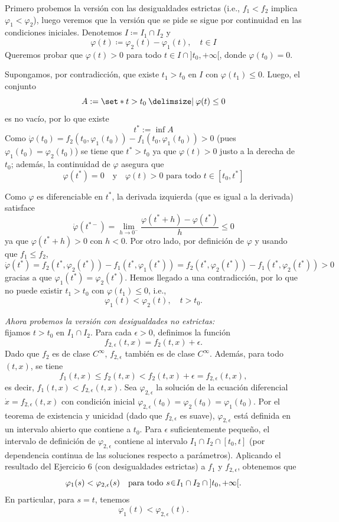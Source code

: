 \begin{sol}[Demostración]
Primero probemos la versión con las desigualdades estrictas (i.e.,  $f_1 < f_2$ implica $\varphi_1 < \varphi_2$), luego veremos que la versión que se pide se sigue por continuidad en las condiciones iniciales.
Denotemos $I \coloneqq I_1 \cap I_2$ y
\[
\varphi(t) \coloneqq \varphi_2(t) - \varphi_1(t), \quad t \in I
\]
Queremos probar que $\varphi(t) > 0$ para todo $t \in I \cap {]t_0,+\infty[}$, donde $\varphi(t_0)=0$.

Supongamos, por contradicción, que existe $t_1>t_0$ en $I$ con $\varphi(t_1)\leq0$. Luego, el conjunto
\[
A := \set*{ t>t_0 \given \varphi(t) \leq 0 }
\]
es no vacío, por lo que existe
\[
t^* := \inf A
\]
Como $\dot\varphi(t_0) = f_2(t_0, \varphi_1(t_0)) - f_1(t_0, \varphi_1(t_0)) > 0$ (pues $\varphi_1(t_0) = \varphi_2(t_0)$) se tiene que $t^* > t_0$ ya que $\varphi(t) > 0$ justo a la derecha de $t_0$; además, la continuidad de $\varphi$ asegura que 
\[
\varphi(t^*) = 0 \quad \text{y} \quad \varphi(t) > 0 \text{ para todo } t \in [t_0, t^*]
\]

Como $\varphi$ es diferenciable en $t^*$, la derivada izquierda (que es igual a la derivada) satisface
\[
\dot\varphi(t^{*-}) = \lim_{h \to 0^-} \frac{\varphi(t^*+h)-\varphi(t^*)}{h} \le 0
\]
ya que $\varphi(t^*+h) > 0$ con $h < 0$. Por otro lado, por definición de $\varphi$ y usando que $f_1 \le f_2$,
\[
\dot\varphi(t^*) = f_2(t^*, \varphi_2(t^*)) - f_1(t^*, \varphi_1(t^*)) = f_2(t^*, \varphi_2(t^*)) - f_1(t^*, \varphi_2(t^*)) > 0
\]
gracias a que $\varphi_1(t^*) = \varphi_2(t^*)$. Hemos llegado a una contradicción, por lo que no puede existir $t_1>t_0$ con $\varphi(t_1) \leq 0$, i.e.,
\[
\varphi_1(t) < \varphi_2(t), \quad t>t_0.
\]
\par
\emph{Ahora probemos la versión con desigualdades no estrictas:}\\
fijamos $t > t_0$ en $I_1 \cap I_2$. Para cada $\epsilon > 0$, definimos la función
\[
f_{2,\epsilon}(t,x) = f_2(t,x) + \epsilon.
\]
Dado que $f_2$ es de clase $C^\infty$, $f_{2,\epsilon}$ también es de clase $C^\infty$. Además, para todo $(t,x)$, se tiene
\[
f_1(t,x) \leq f_2(t,x) < f_2(t,x) + \epsilon = f_{2,\epsilon}(t,x),
\]
es decir, $f_1(t,x) < f_{2,\epsilon}(t,x)$. Sea $\varphi_{2,\epsilon}$ la solución de la ecuación diferencial $\dot{x} = f_{2,\epsilon}(t,x)$ con condición inicial $\varphi_{2,\epsilon}(t_0) = \varphi_2(t_0) = \varphi_1(t_0)$. Por el teorema de existencia y unicidad (dado que $f_{2,\epsilon}$ es suave), $\varphi_{2,\epsilon}$ está definida en un intervalo abierto que contiene a $t_0$. Para $\epsilon$ suficientemente pequeño, el intervalo de definición de $\varphi_{2,\epsilon}$ contiene al intervalo $I_1 \cap I_2 \cap [t_0, t]$ (por dependencia continua de las soluciones respecto a parámetros). Aplicando el resultado del Ejercicio 6 (con desigualdades estrictas) a $f_1$ y $f_{2,\epsilon}$, obtenemos que
\[
\varphi_1(s) < \varphi_{2,\epsilon}(s) \quad \text{para todo } s \en I_1 \cap I_2 \cap {]t_0, +\infty[}.
\]
En particular, para $s = t$, tenemos
\[
\varphi_1(t) < \varphi_{2,\epsilon}(t).
\]


\end{sol}
